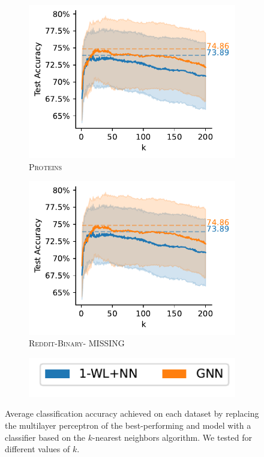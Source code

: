 \begin{figure}[H]
\begin{subfigure}[b]{0.3\textwidth}
		\includegraphics[width=\textwidth]{Figures/knn_PROTEINS.pdf}
		\vspace*{-4ex} 
		\caption{\textsc{Proteins}}
	\end{subfigure}
	\hfill
	\begin{subfigure}[b]{0.3\textwidth}
		\centering
		\includegraphics[width=\textwidth]{Figures/knn_PROTEINS}
		\vspace*{-4ex} 
		\caption{\textsc{Reddit-Binary}- MISSING}
	\end{subfigure}
	\centering
	\begin{subfigure}[b]{0.3\textwidth}
		\centering
		\includegraphics[width=\textwidth]{Figures/train_test_diff_legend.pdf}
		\vspace*{-4ex} 
	\end{subfigure}
	\caption{Average classification accuracy achieved on each dataset by replacing the multilayer perceptron of the best-performing \wlnn and \gnn model with a classifier based on the $k$-nearest neighbors algorithm. We tested for different values of $k$.}
\end{figure}

